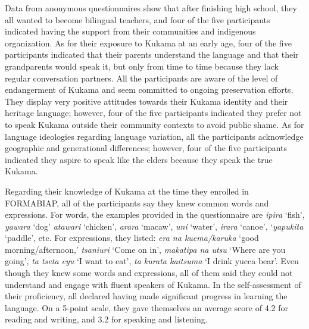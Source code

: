 \documentclass[output=paper]{langscibook}
\begin{document}
Data from anonymous questionnaires show that after finishing high school, they all wanted to become bilingual teachers, and four of the five participants indicated having the support from their communities and indigenous organization. As for their exposure to Kukama at an early age, four of the five participants indicated that their parents understand the language and that their grandparents would speak it, but only from time to time because they lack regular conversation partners. All the participants are aware of the level of endangerment of Kukama and seem committed to ongoing preservation efforts. They display very positive attitudes towards their Kukama identity and their heritage language; however, four of the five participants indicated they prefer not to speak Kukama outside their community contexts to avoid public shame. As for language ideologies regarding language variation, all the participants acknowledge geographic and generational differences; however, four of the five participants indicated they aspire to speak like the elders because they speak the true Kukama.

\begin{sloppypar}
Regarding their knowledge of Kukama at the time they enrolled in FORMABIAP, all of the participants say they knew common words and expressions. For words, the examples provided in the questionnaire are \textit{ipira} ‘fish’, \textit{yawara} ‘dog’ \textit{atawari} ‘chicken’, \textit{arara} ‘macaw’, \textit{uni} ‘water’, \textit{irara} ‘canoe’, ‘\textit{yapukita} ‘paddle’, etc. For expressions, they listed: \textit{era na kuema/karuka} ‘good morning/afternoon,’ \textit{tsaniuri} ‘Come on in’, \textit{makatipa na utsu} ‘Where are you going’, \textit{ta tseta eyu} ‘I want to eat’, \textit{ta kurata kaitsuma} ‘I drink yucca bear’. Even though they knew some words and expressions, all of them said they could not understand and engage with fluent speakers of Kukama. In the self-assessment of their proficiency, all declared having made significant progress in learning the language. On a 5-point scale, they gave themselves an average score of 4.2 for reading and writing, and 3.2 for speaking and listening.
\end{sloppypar}
\end{document}
